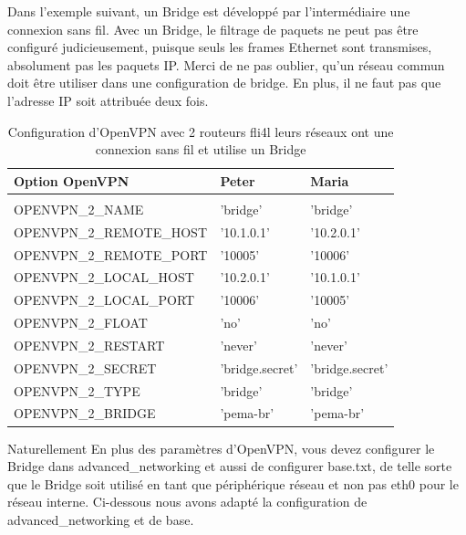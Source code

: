 Dans l'exemple suivant, un Bridge est développé par l'intermédiaire une
connexion sans fil. Avec un Bridge, le filtrage de paquets ne peut pas être
configuré judicieusement, puisque seuls les frames Ethernet sont transmises,
absolument pas les paquets IP. Merci de ne pas oublier, qu'un réseau commun
doit être utiliser dans une configuration de bridge. En plus, il ne faut pas
que l'adresse IP soit attribuée deux fois.

\begin{table}[htbp]
  \begin{scriptsize}
    \begin{tabular}{lll}
      Option OpenVPN           & Peter          & Maria            \\
      \hline \\
      OPENVPN\_2\_NAME         & 'bridge'        & 'bridge'        \\
      OPENVPN\_2\_REMOTE\_HOST & '10.1.0.1'      & '10.2.0.1'      \\
      OPENVPN\_2\_REMOTE\_PORT & '10005'         & '10006'         \\
      OPENVPN\_2\_LOCAL\_HOST  & '10.2.0.1'      & '10.1.0.1'      \\
      OPENVPN\_2\_LOCAL\_PORT  & '10006'         & '10005'         \\
      OPENVPN\_2\_FLOAT        & 'no'            & 'no'            \\
      OPENVPN\_2\_RESTART      & 'never'         & 'never'         \\
      OPENVPN\_2\_SECRET       & 'bridge.secret' & 'bridge.secret' \\
      OPENVPN\_2\_TYPE         & 'bridge'        & 'bridge'        \\
      OPENVPN\_2\_BRIDGE       & 'pema-br'       & 'pema-br'       \\
    \end{tabular}
  \end{scriptsize}
  \caption{Configuration d'OpenVPN avec 2 routeurs fli4l leurs réseaux ont une connexion sans fil et utilise un Bridge}
\end{table}

Naturellement En plus des paramètres d'OpenVPN, vous devez configurer le Bridge
dans advanced\_networking et aussi de configurer base.txt, de telle sorte que
le Bridge soit utilisé en tant que périphérique réseau et non pas eth0 pour le
réseau interne. Ci-dessous nous avons adapté la configuration de
advanced\_networking et de base.

